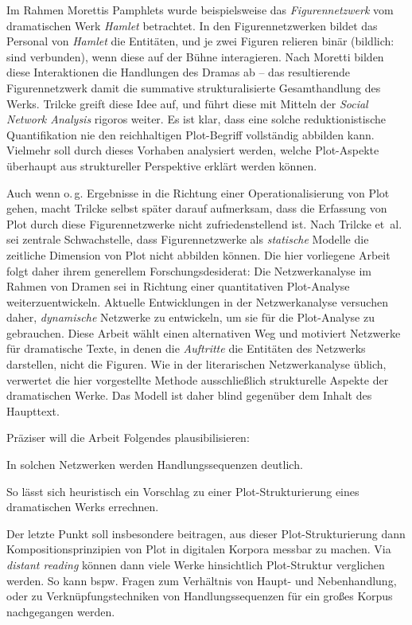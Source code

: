 \documentclass[a4paper,10pt,abstract=true,headings=small]{scrartcl}
\newcommand{\eng}[1]{\textenglish{\emph{#1}}}
\begin{document}
Im Rahmen Morettis Pamphlets wurde beispielsweise das \emph{Figurennetzwerk} vom dramatischen Werk \emph{Hamlet} betrachtet.
In den Figurennetzwerken bildet das Personal von \emph{Hamlet} die Entitäten, und je zwei Figuren relieren binär (bildlich: sind verbunden), wenn diese auf der Bühne interagieren.\autocite[Siehe z.\,B.][13, Abbildung 1]{moretti_network_2011}
Nach Moretti bilden diese Interaktionen die Handlungen des Dramas ab – das resultierende Figurennetzwerk damit die summative strukturalisierte Gesamthandlung des Werks.
Trilcke greift diese Idee auf, und führt diese mit Mitteln der \emph{Social Network Analysis} rigoros weiter.\autocite{trilcke_social_2013} %
Es ist klar, dass eine solche reduktionistische Quantifikation nie den reichhaltigen Plot-Begriff vollständig abbilden kann.
Vielmehr soll durch dieses Vorhaben analysiert werden, welche Plot-Aspekte überhaupt aus struktureller Perspektive erklärt werden können.\autocite[Vgl.][176]{trilcke_netzwerkdynamik_2017}

Auch wenn o.\,g. Ergebnisse in die Richtung einer Operationalisierung von Plot gehen, macht Trilcke selbst später darauf aufmerksam, dass die Erfassung von Plot durch diese Figurennetzwerke nicht zufriedenstellend ist.
Nach Trilcke et~al. sei zentrale Schwachstelle, dass Figurennetzwerke als \emph{statische} Modelle die zeitliche Dimension von Plot nicht abbilden können.\autocite[Vgl.][176]{trilcke_netzwerkdynamik_2017}
Die hier vorliegene Arbeit folgt daher ihrem generellem Forschungsdesiderat: Die Netzwerkanalyse im Rahmen von Dramen sei in Richtung einer quantitativen Plot-Analyse weiterzuentwickeln.
Aktuelle Entwicklungen in der Netzwerkanalyse versuchen daher, \emph{dynamische} Netzwerke zu entwickeln, um sie für die Plot-Analyse zu gebrauchen.\autocite[Vgl.][176]{trilcke_netzwerkdynamik_2017}
Diese Arbeit wählt einen alternativen Weg und motiviert Netzwerke für dramatische Texte, in denen die \emph{Auftritte} die Entitäten des Netzwerks darstellen, nicht die Figuren.
Wie in der literarischen Netzwerkanalyse üblich, verwertet die hier vorgestellte Methode ausschließlich strukturelle Aspekte der dramatischen Werke.
Das Modell ist daher blind gegenüber dem Inhalt des Haupttext.

Präziser will die Arbeit Folgendes plausibilisieren: 
\begin{enumerate*}
    \item In solchen Netzwerken werden Handlungssequenzen deutlich.
    \item So lässt sich heuristisch ein Vorschlag zu einer Plot-Strukturierung eines dramatischen Werks errechnen.
\end{enumerate*}
Der letzte Punkt soll insbesondere beitragen, aus dieser Plot-Strukturierung dann Kompositionsprinzipien von Plot in digitalen Korpora messbar zu machen.
Via \eng{distant reading} können dann viele Werke hinsichtlich Plot-Struktur verglichen werden.
So kann bspw. Fragen zum Verhältnis von Haupt- und Nebenhandlung, oder zu Verknüpfungstechniken von Handlungssequenzen für ein großes Korpus nachgegangen werden. %
\end{document}
